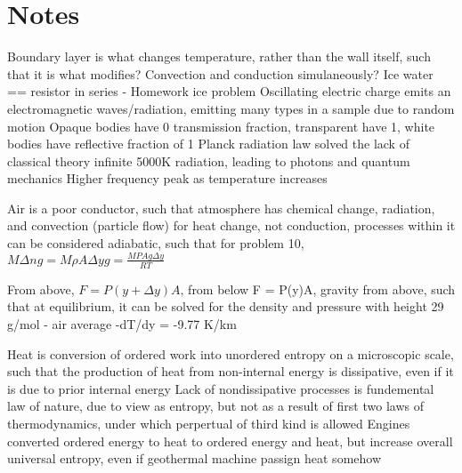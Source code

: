 \documentclass[11 pt, twoside]{article}
\begin{document}
\section{Notes}
Boundary layer is what changes temperature, rather than the wall itself, such that it is what modifies? Convection and conduction simulaneously? Ice water == resistor in series - Homework ice problem
Oscillating electric charge emits an electromagnetic waves/radiation, emitting many types in a sample due to random motion
Opaque bodies have 0 transmission fraction, transparent have 1, white bodies have reflective fraction of 1
Planck radiation law solved the lack of classical theory infinite 5000K radiation, leading to photons and quantum mechanics
Higher frequency peak as temperature increases

Air is a poor conductor, such that atmosphere has chemical change, radiation, and convection (particle flow) for heat change, not conduction, processes within it can be considered adiabatic, such that for problem 10, $M\Delta ng = M\rho A\Delta yg = \frac{MPAg\Delta y}{RT}$

From above, $F = P(y + \Delta y)A$, from below F = P(y)A, gravity from above, such that at equilibrium, it can be solved for the density and pressure with height
29 g/mol - air average
-dT/dy = -9.77 K/km

Heat is conversion of ordered work into unordered entropy on a microscopic scale, such that the production of heat from non-internal energy is dissipative, even if it is due to prior internal energy
Lack of nondissipative processes is fundemental law of nature, due to view as entropy, but not as a result of first two laws of thermodynamics, under which perpertual of third kind is allowed
Engines converted ordered energy to heat to ordered energy and heat, but increase overall universal entropy, even if geothermal machine passign heat somehow
\end{document}
